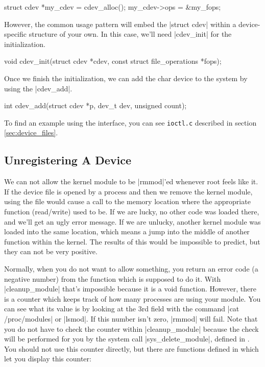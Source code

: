 \documentclass[10pt, oneside]{book}
\begin{document}
\begin{code}
struct cdev *my_cdev = cdev_alloc();
my_cdev->ops = &my_fops;
\end{code}

However, the common usage pattern will embed the \cpp|struct cdev| within a device-specific structure of your own.
In this case, we'll need \cpp|cdev_init| for the initialization.

\begin{code}
void cdev_init(struct cdev *cdev, const struct file_operations *fops);
\end{code}

Once we finish the initialization, we can add the char device to the system by using the \cpp|cdev_add|.

\begin{code}
int cdev_add(struct cdev *p, dev_t dev, unsigned count);
\end{code}

To find an example using the interface, you can see \verb|ioctl.c| described in section \ref{sec:device_files}.

\subsection{Unregistering A Device}
\label{sec:unregister_device}
We can not allow the kernel module to be \sh|rmmod|'ed whenever root feels like it.
If the device file is opened by a process and then we remove the kernel module, using the file would cause a call to the memory location where the appropriate function (read/write) used to be.
If we are lucky, no other code was loaded there, and we'll get an ugly error message.
If we are unlucky, another kernel module was loaded into the same location, which means a jump into the middle of another function within the kernel.
The results of this would be impossible to predict, but they can not be very positive.

Normally, when you do not want to allow something, you return an error code (a negative number) from the function which is supposed to do it.
With \cpp|cleanup_module| that's impossible because it is a void function.
However, there is a counter which keeps track of how many processes are using your module.
You can see what its value is by looking at the 3rd field with the command \sh|cat /proc/modules| or \sh|lsmod|.
If this number isn't zero, \sh|rmmod| will fail.
Note that you do not have to check the counter within \cpp|cleanup_module| because the check will be performed for you by the system call \cpp|sys_delete_module|, defined in .
You should not use this counter directly, but there are functions defined in  which let you display this counter:
\end{document}
